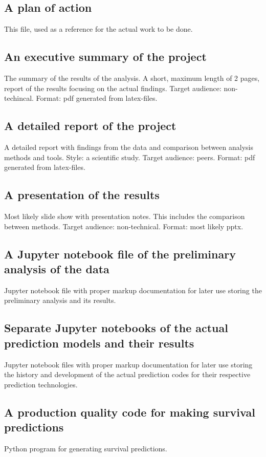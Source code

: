 \documentclass{article}
\begin{document}
\subsection{A plan of action}
This file, used as a reference for the actual work to be done.

\subsection{An executive summary of the project}
The summary of the results of the analysis. A short, maximum length of 2 pages, report of the results focusing on the actual findings. Target audience: non-techincal.  Format: pdf generated from latex-files.

\subsection{A detailed report of the project}
A detailed report with findings from the data and comparison between analysis methods and tools. Style: a scientific study. Target audience: peers.  Format: pdf generated from latex-files.

\subsection{A presentation of the results}
Most likely slide show with presentation notes. This includes the comparison between methods. Target audience: non-technical. Format: most likely pptx.

\subsection{A Jupyter notebook file of the preliminary analysis of the data}
Jupyter notebook file with proper markup documentation for later use storing the preliminary analysis and its results.

\subsection{Separate Jupyter notebooks of the actual prediction models and their results}
 Jupyter notebook files with proper markup documentation for later use storing the history and development of the actual prediction codes for their respective prediction technologies.

\subsection{A production quality code for making survival predictions}
Python program for generating survival predictions.
\end{document}

